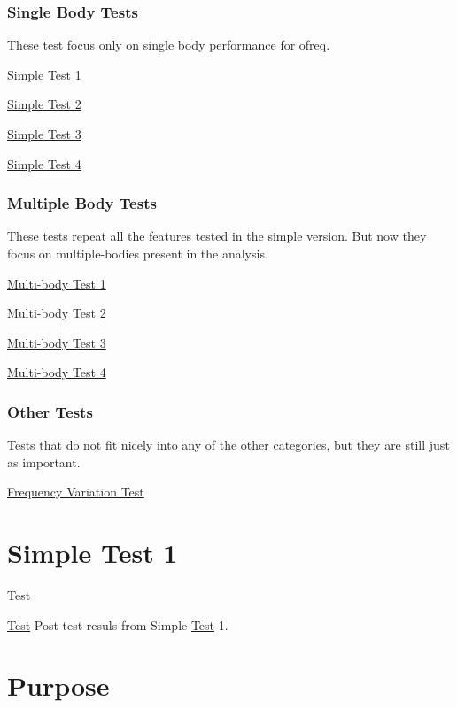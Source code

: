 \subsubsection*{Single Body Tests}

These test focus only on single body performance for ofreq.

\hyperlink{SimpleTest1}{Simple Test 1}

\hyperlink{SimpleTest2}{Simple Test 2}

\hyperlink{SimpleTest3}{Simple Test 3}

\hyperlink{SimpleTest4}{Simple Test 4}

\subsubsection*{Multiple Body Tests}

These tests repeat all the features tested in the simple version. But now they focus on multiple-\/bodies present in the analysis.

\hyperlink{MultiBodyTest1}{Multi-\/body Test 1}

\hyperlink{MultiBodyTest2}{Multi-\/body Test 2}

\hyperlink{MultiBodyTest3}{Multi-\/body Test 3}

\hyperlink{MultiBodyTest4}{Multi-\/body Test 4}

\subsubsection*{Other Tests}

Tests that do not fit nicely into any of the other categories, but they are still just as important.

\hyperlink{TestFrequency}{Frequency Variation Test} \hypertarget{SimpleTest1}{}\section{Simple Test 1}\label{SimpleTest1}
\begin{DoxyRefDesc}{Test}
\item[\hyperlink{test__test000005}{Test}]Post test resuls from Simple \hyperlink{class_test}{Test} 1.\end{DoxyRefDesc}


\section*{Purpose}

